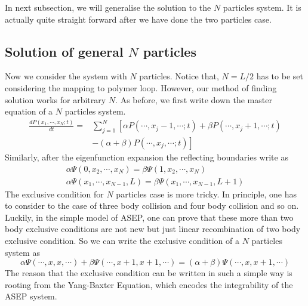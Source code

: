In next subsection, we will generalise the solution to the $N$ particles system. It is actually quite straight forward after we have done the two particles case. 


\subsection{Solution of general $N$ particles}
\label{sub:solution_of_general_n_particles}

Now we consider the system with $N$ particles. Notice that, $N=L/2$ has to be set considering the mapping to polymer loop. However, our method of finding solution works for arbitrary $N$. As before, we first write down the master equation of a $N$ particles system. 
\begin{equation}
    \begin{aligned}
        \label{eq:masterEqN} \frac{d P(x_1, \cdots, x_N; t)}{dt} = & \sum_{j=1}^N \left[\alpha P(\cdots,x_j-1,\cdots;t) + \beta P(\cdots, x_j+1, \cdots;t)\right. \\ 
        & \left.- (\alpha+\beta)P(\cdots, x_j, \cdots; t)\right]
    \end{aligned}
\end{equation}
Similarly, after the eigenfunction expansion the reflecting boundaries write as
\begin{subequations}
    \label{eq:boundaries-N-particles}
    \begin{align}
        \alpha \Psi(0,x_2,\cdots,x_N) = \beta \Psi(1, x_2,\cdots, x_N) \\
        \alpha \Psi(x_1,\cdots, x_{N-1}, L) = \beta \Psi(x_1,\cdots, x_{N-1}, L+1)
    \end{align}
\end{subequations}
The exclusive condition for $N$ particles case is more tricky. In principle, one has to consider to the case of three body collision and four body collision and so on. Luckily, in the simple model of ASEP, one can prove that these more than two body exclusive conditions are not new but just linear recombination of two body exclusive condition. So we can write the exclusive condition of a $N$ particles system as 
\begin{equation}
    \label{eq:exclusionConditionN}
    \alpha \Psi(\cdots,x, x,\cdots) + \beta \Psi(\cdots, x+1, x+1, \cdots) = (\alpha + \beta) \Psi(\cdots, x, x+1, \cdots)
\end{equation}
The reason that the exclusive condition can be written in such a simple way is rooting from the Yang-Baxter Equation, which encodes the integrability of the ASEP system.

